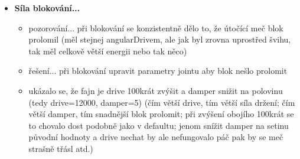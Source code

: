 \begin{itemize}
\begin{itemize}
      \end{itemize}
  \item \textbf{Síla blokování...}
    \begin{itemize}
      \item pozorování... při blokování se konzistentně dělo to, že útočící meč blok prolomil (měl stejnej angularDrivem, ale jak byl zrovna uprostřed švihu, tak měl celkově větší energii nebo tak něco)
      \item řešení... při blokování upravit parametry jointu aby blok nešlo prolomit
      \item ukázalo se, že fajn je drive 100krát zvýšit a damper snižit na polovinu (tedy drive=12000, damper=5) (čím větší drive, tím větší síla držení; čím větší damper, tím snadnější blok prolomit; při zvýšení obojího 100krát se to chovalo dost podobně jako v defaultu; jenom snížit damper na setinu původní hodnoty a drive nechat by ale nefungovalo páč pak by se meč strašně třásl atd.)
    \end{itemize}
\end{itemize}

